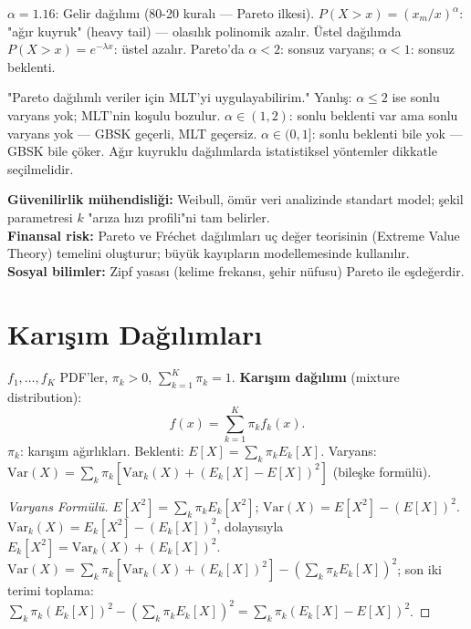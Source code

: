 \begin{ornek}
$\alpha = 1.16$: Gelir dağılımı (80-20 kuralı --- Pareto ilkesi).
$P(X > x) = (x_m/x)^\alpha$: "ağır kuyruk" (heavy tail) --- olasılık polinomik azalır.
Üstel dağılımda $P(X > x) = e^{-\lambda x}$: üstel azalır.
Pareto'da $\alpha < 2$: sonsuz varyans; $\alpha < 1$: sonsuz beklenti.
\end{ornek}

\begin{hataanalizi}
"Pareto dağılımlı veriler için MLT'yi uygulayabilirim."
Yanlış: $\alpha \leq 2$ ise sonlu varyans yok; MLT'nin koşulu bozulur.
$\alpha \in (1,2)$: sonlu beklenti var ama sonlu varyans yok --- GBSK geçerli, MLT geçersiz.
$\alpha \in (0,1]$: sonlu beklenti bile yok --- GBSK bile çöker.
Ağır kuyruklu dağılımlarda istatistiksel yöntemler dikkatle seçilmelidir.
\end{hataanalizi}

\begin{disiplinlerarasibaglan}
\textbf{Güvenilirlik mühendisliği:} Weibull, ömür veri analizinde standart model;
şekil parametresi $k$ "arıza hızı profili"ni tam belirler.\\
\textbf{Finansal risk:} Pareto ve Fréchet dağılımları uç değer teorisinin
(Extreme Value Theory) temelini oluşturur; büyük kayıpların modellemesinde kullanılır.\\
\textbf{Sosyal bilimler:} Zipf yasası (kelime frekansı, şehir nüfusu) Pareto ile eşdeğerdir.
\end{disiplinlerarasibaglan}

\section{Karışım Dağılımları}
\label{sec:karisim_dagilim}

\begin{tanim}
\label{def:karisim}
$f_1, \ldots, f_K$ PDF'ler, $\pi_k > 0$, $\sum_{k=1}^K \pi_k = 1$.
\textbf{Karışım dağılımı} (mixture distribution):
\[
  f(x) = \sum_{k=1}^K \pi_k f_k(x).
\]
$\pi_k$: karışım ağırlıkları. Beklenti: $E[X] = \sum_k \pi_k E_k[X]$.
Varyans: $\mathrm{Var}(X) = \sum_k \pi_k [\mathrm{Var}_k(X) + (E_k[X] - E[X])^2]$ (bileşke formülü).
\end{tanim}

\begin{proof}[Varyans Formülü]
$E[X^2] = \sum_k \pi_k E_k[X^2]$; $\mathrm{Var}(X) = E[X^2] - (E[X])^2$.
$\mathrm{Var}_k(X) = E_k[X^2] - (E_k[X])^2$, dolayısıyla $E_k[X^2] = \mathrm{Var}_k(X) + (E_k[X])^2$.
$\mathrm{Var}(X) = \sum_k\pi_k[\mathrm{Var}_k(X) + (E_k[X])^2] - (\sum_k\pi_k E_k[X])^2$;
son iki terimi toplama: $\sum_k\pi_k(E_k[X])^2 - (\sum_k\pi_k E_k[X])^2 = \sum_k\pi_k(E_k[X]-E[X])^2$.
\end{proof}

